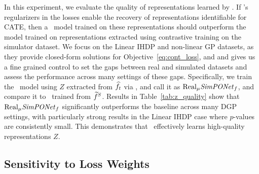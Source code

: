 In this experiment, we evaluate the quality of representations learned by \our. If \our's regularizers in the losses enable the recovery of representations identifiable for CATE, then a \realonly\ model trained on these representations should outperform the \muonly model trained on representations extracted using contrastive training on the simulator dataset. We focus on the Linear IHDP and non-linear GP datasets, as they provide closed-form solutions for Objective~\ref{eq:cont_loss}, and and gives us a fine grained control to set the gaps between real and simulated datasets and assess the performance across many settings of these gaps. Specifically, we train the \realonly\ model using $Z$ extracted from $\widehat{f}_t$ via \our, and call it as $\text{Real}_\mu\text{\textit{SimPONet}}_f$, and compare it to \muonly\ trained from $\widetilde{f}^S$. Results in Table~\ref{tab:z_quality} show that $\text{Real}_\mu\text{\textit{SimPONet}}_f$ significantly outperforms the baseline \muonly across many DGP settings, with particularly strong results in the Linear IHDP case where $p$-values are consistently small. This demonstrates that \our\ effectively learns high-quality representations $Z$.


\subsection{Sensitivity to Loss Weights}




